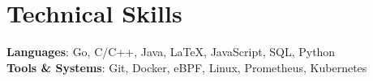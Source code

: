 \documentclass[letterpaper,11pt]{article}
\begin{document}
%
\section{Technical Skills}
 \begin{itemize}[leftmargin=0.15in, label={}]
    \small{\item{
     \textbf{Languages}{: Go, C/C++, Java, \LaTeX, JavaScript, SQL, Python} \\
     \textbf{Tools \& Systems}{: Git, Docker, eBPF, Linux, Prometheus, Kubernetes} \\
    }}
 \end{itemize}


\nocite{*}
\printbibliography[title=Publications]
 
\end{document}
